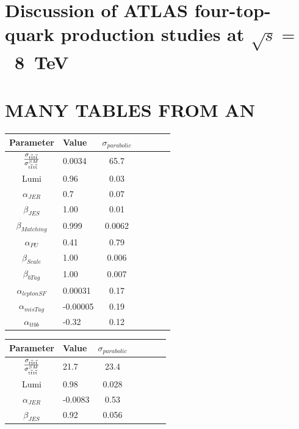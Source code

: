 \section{Discussion of ATLAS four-top-quark production studies at $\sqrt{s} =$~8~TeV}
\label{sec:ATLASresult}

\section{MANY TABLES FROM AN}



\begin{table}[ht!]
\centering
\begin{tabular}{|c lc |c |c l p{1cm} |}
 \hline 
Parameter &   Value & $\sigma_{parabolic}$  \\
  \hline   
 $\frac{\sigma_{\mathrm{t}\overline{\mathrm{t}}\mathrm{t}\overline{\mathrm{t}}}}{\sigma^{SM}_{\mathrm{t}\overline{\mathrm{t}}\mathrm{t}\overline{\mathrm{t}}}}$  & 0.0034   & 65.7 \\
  \hline  
 Lumi    &     0.96 &  0.03   \\
   \hline  
  $\alpha_{JER}$ &   0.7 &  0.07  \\ 
  \hline  
  $\beta_{JES}$  & 1.00   & 0.01    \\
  \hline  
  $\beta_{Matching}$ & 0.999 &  0.0062\\  
  \hline  
  $\alpha_{PU}$    & 0.41  & 0.79 \\
  \hline  
  $\beta_{Scale}$  & 1.00 & 0.006  \\ 
  \hline  
  $\beta_{bTag}$ & 1.00  & 0.007  \\
  \hline  
  $\alpha_{leptonSF}$ & 0.00031 & 0.17 \\   
  \hline  
  $\alpha_{misTag}$ & -0.00005  & 0.19 \\
  \hline  
  $\alpha_{ttbb}$  & -0.32  & 0.12  \\
  \hline
\end{tabular}
\begin{tabular}{|c lc |c |c l p{1cm} |}
 \hline 
 Parameter &   Value & $\sigma_{parabolic}$  \\
  \hline   
 $\frac{\sigma_{\mathrm{t}\overline{\mathrm{t}}\mathrm{t}\overline{\mathrm{t}}}}{\sigma^{SM}_{\mathrm{t}\overline{\mathrm{t}}\mathrm{t}\overline{\mathrm{t}}}}$  & 21.7  & 23.4  \\
  \hline  
  Lumi    &     0.98 &  0.028   \\
  \hline  
  $\alpha_{JER}$ &   -0.0083 &  0.53  \\ 
  \hline  
  $\beta_{JES}$  & 0.92   & 0.056   \\

\end{tabular}
\end{table}

